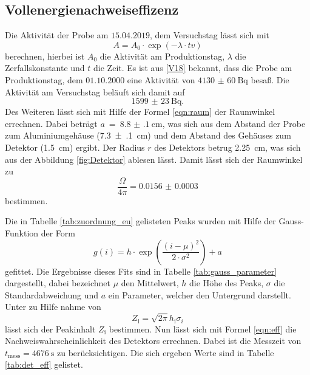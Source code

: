\subsection{Vollenergienachweiseffizenz}
\label{sec:Vollenergienachweiseffizenz}
Die Aktivität der Probe am $15.04.2019$, dem Versuchstag lässt sich mit
\begin{equation}
  A = A_0 \cdot \exp{\left(-\lambda \cdot tv\right)}
\end{equation}
berechnen, hierbei ist $A_0$ die Aktivität am Produktionstag, $\lambda$ die Zerfallskonstante und $t$ die Zeit.
Es ist aus \ref{V18} bekannt, dass die Probe am Produktionstag, dem
$01.10.2000$ eine Aktivität von $\SI{4130(60)}{\becquerel}$ besaß.
Die Aktivität am Versuchstag beläuft sich damit auf
\begin{equation}
  \SI{1599(23)}{\becquerel}.
\end{equation}
Des Weiteren lässt sich mit Hilfe der Formel \ref{eqn:raum} der Raumwinkel errechnen.
Dabei beträgt $a~=~\SI{8.8(1)}{\centi\meter}$, was sich aus dem Abstand der Probe zum
Aluminiumgehäuse (\SI{7.3(1)}{\centi\meter}) und dem Abstand des Gehäuses zum Detektor 
(\SI{1.5}{\centi\meter}) ergibt. Der Radius $r$ des Detektors betrug \SI{2.25}{\centi\meter}, was sich
aus der Abbildung \ref{fig:Detektor} ablesen lässt. Damit lässt sich der Raumwinkel zu
\begin{equation}
  \frac{\Omega}{4\pi} = \num{0.0156(3)}
\end{equation}
bestimmen.

Die in Tabelle \ref{tab:zuordnung_eu} gelisteten Peaks wurden mit Hilfe der
Gauss-Funktion der Form
\begin{equation}
  g(i) = h \cdot \exp{\left(\frac{\left(i - \mu\right)^2}{2 \cdot \sigma^2}\right)} + a
\end{equation}
gefittet. Die Ergebnisse dieses Fits sind in Tabelle \ref{tab:gauss_parameter}
dargestellt, dabei bezeichnet $\mu$ den Mittelwert, $h$ die Höhe des Peaks, $\sigma$
die Standardabweichung und $a$ ein Parameter, welcher den Untergrund darstellt.
Unter zu Hilfe nahme von
\begin{equation}
  Z_\text{i} = \sqrt{2\pi} h_\text{i} \sigma_{i}
\end{equation}
lässt sich der Peakinhalt $Z_\text{i}$ bestimmen. Nun lässt sich mit Formel \ref{eqn:eff}
die Nachweiswahrscheinlichkeit des Detektors errechnen. Dabei ist die Messzeit von $t_\text{mess} = \SI{4676}{\second}$
zu berücksichtigen. Die sich ergeben Werte sind in Tabelle \ref{tab:det_eff} gelistet.

